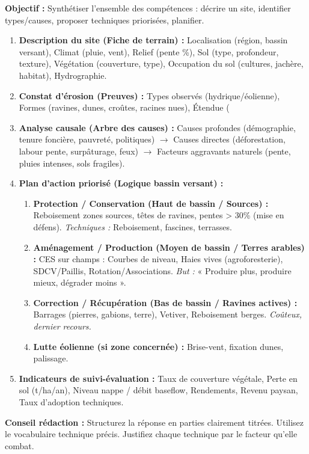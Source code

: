 \documentclass[11pt]{article}
\begin{document}
\begin{methode}
    \textbf{Objectif :} Synthétiser l'ensemble des compétences : décrire un site, identifier types/causes, proposer techniques priorisées, planifier.
    \begin{enumerate}
        \item \textbf{Description du site (Fiche de terrain) :} Localisation (région, bassin versant), Climat (pluie, vent), Relief (pente \%), Sol (type, profondeur, texture), Végétation (couverture, type), Occupation du sol (cultures, jachère, habitat), Hydrographie.
        \item \textbf{Constat d'érosion (Preuves) :} Types observés (hydrique/éolienne), Formes (ravines, dunes, croûtes, racines nues), Étendue (%
        \item \textbf{Analyse causale (Arbre des causes) :} Causes profondes (démographie, tenure foncière, pauvreté, politiques) $\rightarrow$ Causes directes (déforestation, labour pente, surpâturage, feux) $\rightarrow$ Facteurs aggravants naturels (pente, pluies intenses, sols fragiles).
        \item \textbf{Plan d'action priorisé (Logique bassin versant) :}
        \begin{enumerate}
            \item \textbf{Protection / Conservation (Haut de bassin / Sources) :} Reboisement zones sources, têtes de ravines, pentes > 30\% (mise en défens). \emph{Techniques :} Reboisement, fascines, terrasses.
            \item \textbf{Aménagement / Production (Moyen de bassin / Terres arables) :} CES sur champs : Courbes de niveau, Haies vives (agroforesterie), SDCV/Paillis, Rotation/Associations. \emph{But :} « Produire plus, produire mieux, dégrader moins ».
            \item \textbf{Correction / Récupération (Bas de bassin / Ravines actives) :} Barrages (pierres, gabions, terre), Vetiver, Reboisement berges. \emph{Coûteux, dernier recours.}
            \item \textbf{Lutte éolienne (si zone concernée) :} Brise-vent, fixation dunes, palissage.
        \end{enumerate}
        \item \textbf{Indicateurs de suivi-évaluation :} Taux de couverture végétale, Perte en sol (t/ha/an), Niveau nappe / débit baseflow, Rendements, Revenu paysan, Taux d'adoption techniques.
    \end{enumerate}
    \textbf{Conseil rédaction :} Structurez la réponse en parties clairement titrées. Utilisez le vocabulaire technique précis. Justifiez chaque technique par le facteur qu'elle combat.
\end{methode}
\end{document}
